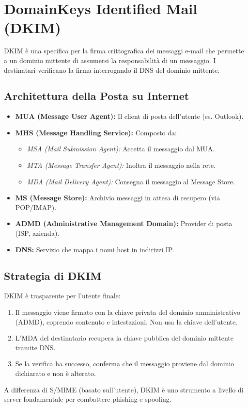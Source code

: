 \section{DomainKeys Identified Mail (DKIM)}

DKIM è una specifica per la firma crittografica dei messaggi e-mail che permette a un dominio mittente di assumersi la responsabilità di un messaggio. I destinatari verificano la firma interrogando il DNS del dominio mittente.

\subsection{Architettura della Posta su Internet}
\begin{itemize}
    \item \textbf{MUA (Message User Agent):} Il client di posta dell'utente (es. Outlook).
    \item \textbf{MHS (Message Handling Service):} Composto da:
    \begin{itemize}
        \item \textit{MSA (Mail Submission Agent):} Accetta il messaggio dal MUA.
        \item \textit{MTA (Message Transfer Agent):} Inoltra il messaggio nella rete.
        \item \textit{MDA (Mail Delivery Agent):} Consegna il messaggio al Message Store.
    \end{itemize}
    \item \textbf{MS (Message Store):} Archivio messaggi in attesa di recupero (via POP/IMAP).
    \item \textbf{ADMD (Administrative Management Domain):} Provider di posta (ISP, azienda).
    \item \textbf{DNS:} Servizio che mappa i nomi host in indirizzi IP.
\end{itemize}

\subsection{Strategia di DKIM}
DKIM è trasparente per l'utente finale:
\begin{enumerate}
    \item Il messaggio viene firmato con la chiave privata del dominio amministrativo (ADMD), coprendo contenuto e intestazioni. Non usa la chiave dell'utente.
    \item L'MDA del destinatario recupera la chiave pubblica del dominio mittente tramite DNS.
    \item Se la verifica ha successo, conferma che il messaggio proviene dal dominio dichiarato e non è alterato.
\end{enumerate}
A differenza di S/MIME (basato sull'utente), DKIM è uno strumento a livello di server fondamentale per combattere phishing e spoofing.

